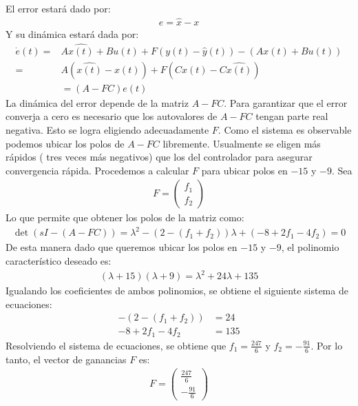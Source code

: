 \documentclass[
  11pt,
  letterpaper,
   addpoints,
  answers
  ]{exam}
\begin{document}
\begin{questions}
\begin{solution}
\begin{figure}[H]
  \end{figure}
El error estará dado por:
  \begin{align}
    e = \hat x - x
  \end{align}
  Y su dinámica estará dada por:
  \begin{align}
    \dot{e}(t) =& A\hat{x(t)} + Bu(t) + F(y(t) - \hat{y}(t)) - (Ax(t) + Bu(t)) \\
    =& A(\hat{x(t)} - x(t)) + F(Cx(t) - C\hat{x(t)})\\
     &= (A - FC)e(t)
  \end{align}
  La dinámica del error depende de la matriz $A - FC$. Para garantizar que el error converja a cero es necesario que los autovalores de $A - FC$ tengan parte real negativa. Esto se logra eligiendo adecuadamente $F$. Como el sistema es observable podemos ubicar los polos de $A - FC$ libremente. Usualmente se eligen más rápidos ( tres veces más negativos) que los del controlador para asegurar convergencia rápida. Procedemos a calcular $F$ para ubicar polos en $-15$ y $-9$. Sea
  \begin{align}
    F = \begin{pmatrix} f_1 \\ f_2 \end{pmatrix}
  \end{align}
  Lo que permite que obtener los polos de la matriz como:
  \begin{align}
    \det(sI - (A - FC)) = \lambda^{2} - (2 - (f_1 + f_2))\lambda + (-8 + 2f_1 - 4f_2) = 0
  \end{align}
  De esta manera dado que queremos ubicar los polos en $-15$ y $-9$, el polinomio característico deseado es:
  \begin{align}
    (\lambda + 15)(\lambda + 9) = \lambda^{2} + 24\lambda + 135
  \end{align}
  Igualando los coeficientes de ambos polinomios, se obtiene el siguiente sistema de ecuaciones:
  \begin{align}
    -(2 - (f_1 + f_2)) &= 24 \\
    -8 + 2f_1 - 4f_2 &= 135
  \end{align}
  Resolviendo el sistema de ecuaciones, se obtiene que $f_1 = \frac{247}{6}$ y $f_2 = -\frac{91}{6}$. Por lo tanto, el vector de ganancias $F$ es:
  \begin{align}
    F = \begin{pmatrix} \frac{247}{6} \\ -\frac{91}{6} \end{pmatrix}
  \end{align}

\end{solution}
\end{questions}
\end{document}
